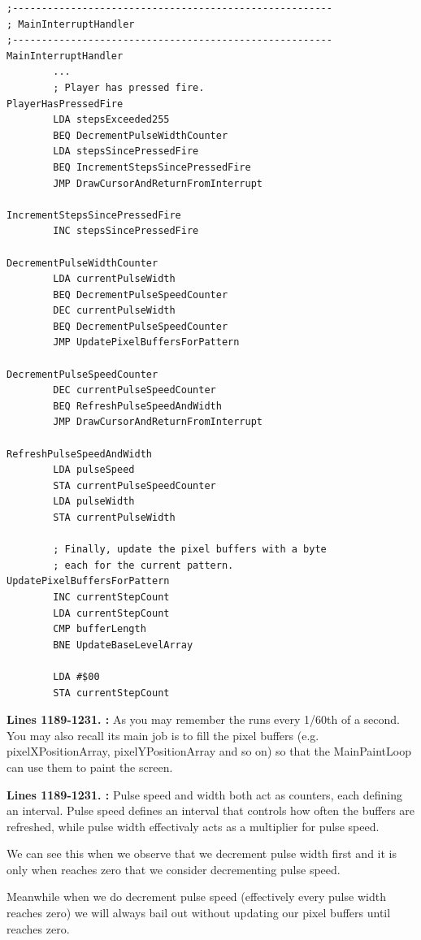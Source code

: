 \clearpage
\begin{lstlisting}[caption=From \icode{MainInterruptHandler}.]
;-------------------------------------------------------
; MainInterruptHandler
;-------------------------------------------------------
MainInterruptHandler
        ...
        ; Player has pressed fire.
PlayerHasPressedFire   
        LDA stepsExceeded255
        BEQ DecrementPulseWidthCounter
        LDA stepsSincePressedFire
        BEQ IncrementStepsSincePressedFire
        JMP DrawCursorAndReturnFromInterrupt

IncrementStepsSincePressedFire   
        INC stepsSincePressedFire

DecrementPulseWidthCounter   
        LDA currentPulseWidth
        BEQ DecrementPulseSpeedCounter
        DEC currentPulseWidth
        BEQ DecrementPulseSpeedCounter
        JMP UpdatePixelBuffersForPattern

DecrementPulseSpeedCounter   
        DEC currentPulseSpeedCounter
        BEQ RefreshPulseSpeedAndWidth
        JMP DrawCursorAndReturnFromInterrupt

RefreshPulseSpeedAndWidth   
        LDA pulseSpeed
        STA currentPulseSpeedCounter
        LDA pulseWidth
        STA currentPulseWidth

        ; Finally, update the pixel buffers with a byte
        ; each for the current pattern.        
UpdatePixelBuffersForPattern    
        INC currentStepCount
        LDA currentStepCount
        CMP bufferLength
        BNE UpdateBaseLevelArray

        LDA #$00
        STA currentStepCount
\end{lstlisting}
\clearpage

\textbf{Lines 1189-1231. :} 
As you may remember the  runs every 1/60th of a
second.  You may also recall its main job is to fill the pixel buffers (e.g.
pixelXPositionArray, pixelYPositionArray and so on) so that the MainPaintLoop
can use them to paint the screen. 

\textbf{Lines 1189-1231. :} 
Pulse speed and width both act as counters, each defining an interval. Pulse speed
defines an interval that controls how often the buffers are refreshed, while 
pulse width effectivaly acts as a multiplier for pulse speed.

We can see this when we observe that we decrement pulse width first and it is only
when  reaches zero that we consider decrementing pulse speed.

Meanwhile when we do decrement pulse speed (effectively every pulse width reaches zero)
we will always bail out without updating our pixel buffers until 
reaches zero.

\clearpage

